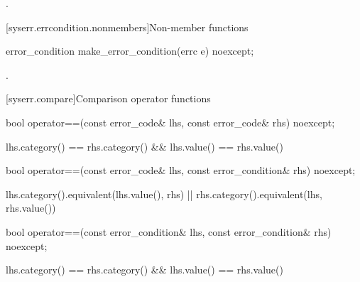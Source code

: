 \begin{itemdescr}
\pnum
\returns
{}.
\end{itemdescr}

[syserr.errcondition.nonmembers]{Non-member functions}

%
\begin{itemdecl}
error_condition make_error_condition(errc e) noexcept;
\end{itemdecl}

\begin{itemdescr}
\pnum
\returns
{}.
\end{itemdescr}

[syserr.compare]{Comparison operator functions}

%
\begin{itemdecl}
bool operator==(const error_code& lhs, const error_code& rhs) noexcept;
\end{itemdecl}

\begin{itemdescr}
\pnum
\returns
\begin{codeblock}
lhs.category() == rhs.category() && lhs.value() == rhs.value()
\end{codeblock}
\end{itemdescr}

%
%
\begin{itemdecl}
bool operator==(const error_code& lhs, const error_condition& rhs) noexcept;
\end{itemdecl}

\begin{itemdescr}
\pnum
\returns
\begin{codeblock}
lhs.category().equivalent(lhs.value(), rhs) || rhs.category().equivalent(lhs, rhs.value())
\end{codeblock}
\end{itemdescr}

%
\begin{itemdecl}
bool operator==(const error_condition& lhs, const error_condition& rhs) noexcept;
\end{itemdecl}

\begin{itemdescr}
\pnum
\returns
\begin{codeblock}
lhs.category() == rhs.category() && lhs.value() == rhs.value()
\end{codeblock}
\end{itemdescr}

